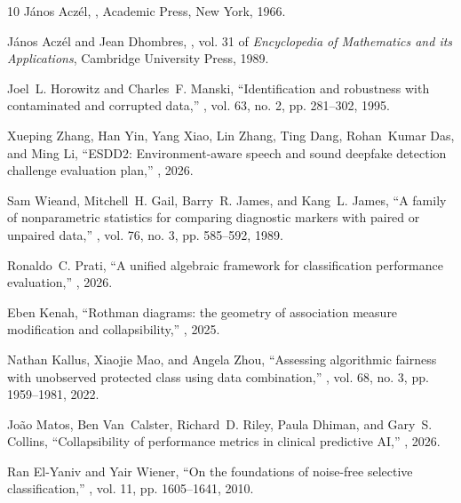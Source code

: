 \documentclass[10pt]{article}
\begin{document}
\begin{thebibliography}{10}
J\'{a}nos Acz\'{e}l,
,
\newblock Academic Press, New York, 1966.

J\'{a}nos Acz\'{e}l and Jean Dhombres,
, vol. 31 of {\em Encyclopedia of Mathematics and its Applications},
\newblock Cambridge University Press, 1989.

Joel~L. Horowitz and Charles~F. Manski,
\newblock ``Identification and robustness with contaminated and corrupted data,''
, vol. 63, no. 2, pp. 281--302, 1995.

Xueping Zhang, Han Yin, Yang Xiao, Lin Zhang, Ting Dang, Rohan~Kumar Das, and Ming Li,
\newblock ``{ESDD2}: Environment-aware speech and sound deepfake detection challenge evaluation plan,''
, 2026.

Sam Wieand, Mitchell~H. Gail, Barry~R. James, and Kang~L. James,
\newblock ``A family of nonparametric statistics for comparing diagnostic markers with paired or unpaired data,''
, vol. 76, no. 3, pp. 585--592, 1989.

Ronaldo~C. Prati,
\newblock ``A unified algebraic framework for classification performance evaluation,''
, 2026.

Eben Kenah,
\newblock ``Rothman diagrams: the geometry of association measure modification and collapsibility,''
, 2025.

Nathan Kallus, Xiaojie Mao, and Angela Zhou,
\newblock ``Assessing algorithmic fairness with unobserved protected class using data combination,''
, vol. 68, no. 3, pp. 1959--1981, 2022.

Jo\~{a}o Matos, Ben Van~Calster, Richard~D. Riley, Paula Dhiman, and Gary~S. Collins,
\newblock ``Collapsibility of performance metrics in clinical predictive {AI},''
, 2026.

Ran El-Yaniv and Yair Wiener,
\newblock ``On the foundations of noise-free selective classification,''
, vol. 11, pp. 1605--1641, 2010.


\end{thebibliography}
\end{document}
